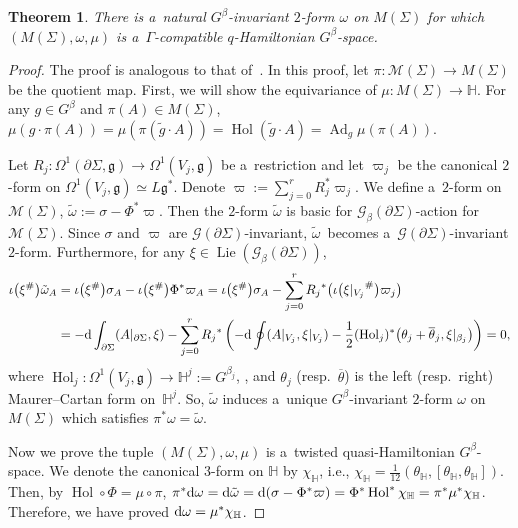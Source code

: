 \documentclass[10pt,a4paper]{amsart}
\numberwithin{equation}{section}
\newtheorem{Theorem}{Theorem}[section]
\theoremstyle{definition}
\newcommand{\Ad}{\operatorname{Ad}}
\newcommand{\Hol}{\operatorname{Hol}}
\newcommand{\Lie}{\operatorname{Lie}}
\newcommand{\bH}{\mathbb{H}}
\begin{document}
\begin{Theorem}\label{q-Ham str on M(X)}
 There is a~natural $G^{\beta}$-invariant $2$-form $\omega$ on $M(\Sigma)$ for which $(M(\Sigma),\omega,\mu)$ is a~$\Gamma$-compatible $q$-Hamiltonian $G^{\beta}$-space.
\end{Theorem}

\begin{proof}
 The proof is analogous to that of~\cite[Theorem 9.1]{AMM}.
 In this proof, let $\pi \colon \mathcal{M}(\Sigma) \to M(\Sigma) $ be the quotient map.
 First, we will show the equivariance of $\mu \colon M(\Sigma) \to \bH$.
 For any $g \in G^{\beta}$ and $\pi(A) \in M(\Sigma)$,
$\mu(g \cdot \pi(A)) = \mu (\pi(\tilde{g}\cdot A)) = \Hol(\tilde{g}\cdot A)= \Ad_{g} \mu(\pi(A))$.

Let $R_{j} \colon \Omega^1(\partial \Sigma, \mathfrak{g}) \to \Omega^1(V_j,\mathfrak{g})$ be a~restriction and let $\varpi_{j}$ be the canonical $2$-form on $\Omega^{1}(V_j, \mathfrak{g}) \simeq L\mathfrak{g}^*$.
 Denote $\varpi := \sum_{j=0}^{r} R_{j}^*\varpi_{j}$. We define a~$2$-form on $\mathcal{M}(\Sigma)$, $\tilde{\omega} := \sigma - \Phi^*\varpi$.
 Then the $2$-form $\tilde{\omega}$ is basic for $\mathcal{G}_{\beta}(\partial \Sigma)$-action for $\mathcal{M}(\Sigma)$.
 Since $\sigma$ and $\varpi$ are $\mathcal{G}(\partial \Sigma)$-invariant, $\tilde{\omega}$~becomes a~$\mathcal{G}(\partial \Sigma)$-invariant $2$-form.
 Furthermore, for any $\xi \in \Lie(\mathcal{G}_{\beta}(\partial \Sigma))$,
 \begin{align*}
 \iota\bigl(\xi^{\#}\bigr)\tilde{\omega}_A &= \iota\bigl(\xi^{\#}\bigr)\sigma_A - \iota\bigl(\xi^{\#}\bigr) \Phi^* \varpi_A
 = \iota\bigl(\xi^{\#}\bigr) \sigma_A - \sum_{j=0}^{r} {R_j}^* \bigl(\iota\bigl({\xi|_{V_j}}^{\#}\bigr)\varpi_j\bigr)\\
 &= -{\rm d} \int_{\partial \Sigma }(A|_{\partial \Sigma}, \xi)- \sum_{j=0}^{r} {R_{j}}^*\left(-{\rm d} \oint (A|_{V_j},\xi|_{V_j}) -\frac{1}{2}(\Hol_{j})^* \bigl(\theta_{j}+ \overline{\theta}_{j}, \xi|_{\beta_{j}}\bigr) \right)= 0,
 \end{align*}
 where $\Hol_j \colon \Omega^1(V_{j},\mathfrak{g}) \to \bH^{j} := G^{\beta_j}$, \smash{$A_j \mapsto \bigl(\Hol^{b^{j}_\lambda}_{b^{j}_\lambda}(A_j)\bigr)$}, and $\theta_j $ (resp.\ $\overline{\theta}$) is the left (resp.\ right) Maurer--Cartan form on~$\bH^j$.
 So, $\tilde{\omega}$ induces a~unique $G^{\beta}$-invariant $2$-form $\omega$ on $M(\Sigma)$ which satisfies $\pi^* \omega = \tilde{\omega}$.

 Now we prove the tuple $(M(\Sigma),\omega,\mu)$ is a~twisted quasi-Hamiltonian $G^{\beta}$-space.
 We denote the canonical $3$-form on $\bH$ by $\chi_{\bH}$, i.e., $\chi_{\bH} = \frac{1}{12}(\theta_{\bH},[\theta_{\bH},\theta_{\bH}])$.
 Then, by $\Hol \circ \Phi = \mu \circ \pi$,
$
 \pi^*{\rm d}\omega = {\rm d}\tilde{\omega}= {\rm d}( \sigma - \Phi^* \varpi)
 = \Phi^* \Hol^* \chi_{\bH}
 = \pi^* \mu^* \chi_{\bH}$.
 Therefore, we have proved ${\rm d} \omega = \mu^* \chi_{\bH}$.


\end{proof}
\end{document}
